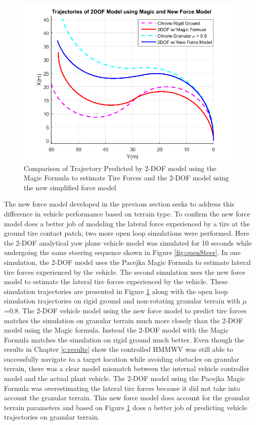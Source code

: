 \documentclass[12pt,onecolumn]{report}
\newcommand{\CHRONO}{{\sffamily{{Chrono}}}}
\begin{document}
\begin{figure}
	\centering
	\includegraphics[width=0.8\columnwidth]{Figs/MagicvsNew.png}
	\caption{\small Comparison of Trajectory Predicted by 2-DOF model using the Magic Formula to estimate Tire Forces and the 2-DOF model using the new simplified force model}  
	\label{fig:MagicvsNew}
\end{figure}

The new force model developed in the previous section seeks to address this difference in vehicle performance based on terrain type. To confirm the new force model does a better job of modeling the lateral force experienced by a tire at the ground tire contact patch, two more open loop simulations were performed. Here the 2-DOF analytical yaw plane vehicle model was simulated for 10 seconds while undergoing the same steering sequence shown in Figure \ref{fig:openSteer}. In one simulation, the 2-DOF model uses the Pacejka Magic Formula to estimate lateral tire forces experienced by the vehicle. The second simulation uses the new force model to estimate the lateral tire forces experienced by the vehicle. These simulation trajectories are presented in Figure \ref{fig:MagicvsNew} along with the {\CHRONO} open loop simulation trajectories on rigid ground and non-rotating granular terrain with $\mu$=0.8. The 2-DOF vehicle model using the new force model to predict tire forces matches the {\CHRONO} simulation on granular terrain much more closely than the 2-DOF model using the Magic formula. Instead the 2-DOF model with the Magic Formula matches the {\CHRONO} simulation on rigid ground much better. Even though the results in Chapter \ref{c:results} show the controlled HMMWV was still able to successfully navigate to a target location while avoiding obstacles on granular terrain, there was a clear model mismatch between the internal vehicle controller model and the actual plant vehicle. The 2-DOF model using the Pacejka Magic Formula was overestimating the lateral tire forces because it did not take into account the granular terrain. This new force model does account for the granular terrain parameters and based on Figure \ref{fig:MagicvsNew} does a better job of predicting vehicle trajectories on granular terrain. 
\end{document}
